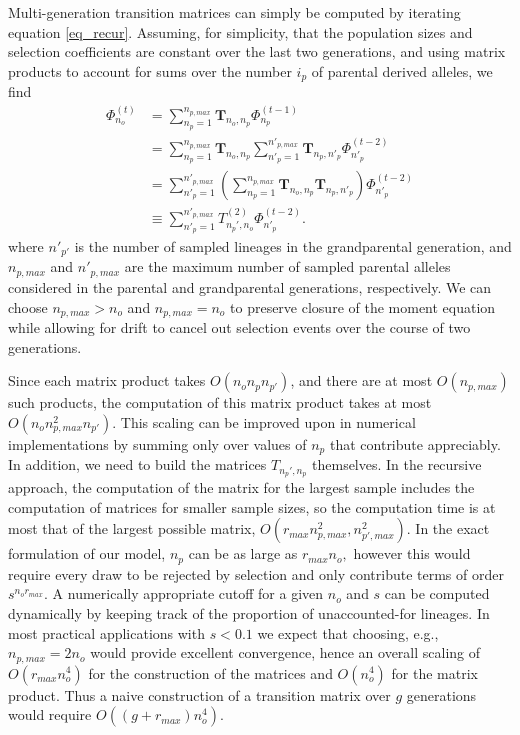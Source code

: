 \documentclass[9pt,twocolumn,twoside,lineno]{gsajnl}
\newcommand{\afs}[2]{\Phi_{#1}^{(#2)}}
\begin{document}
Multi-generation transition matrices can simply be computed by iterating equation \eqref{eq_recur}.
Assuming, for simplicity, that the population sizes and selection coefficients are constant over the
last two generations, and using matrix products to account for sums over the number $i_p$ of
parental derived alleles, we find
\begin{equation}
\begin{split}
\afs{n_o}{t} &=  \sum_{n_p=1}^{n_{p,max}}  \mathbf{T}_{n_o,n_p}     \afs{n_p}{t-1}\\
&=  \sum_{n_p=1}^{n_{p,max}} \mathbf{T}_{n_o,n_p}     \sum_{n'_p=1}^{n'_{p,max}}  \mathbf{T}_{n_p,n'_p}\afs{n'_p}{t-2}\\
&=  \sum_{n'_p=1}^{n'_{p,max}}  \left(\sum_{n_p=1}^{n_{p,max}} \mathbf{T}_{n_o,n_p}
    \mathbf{T}_{n_p,n'_p} \right)\afs{n'_p}{t-2}\\
&\equiv  \sum_{n'_p=1}^{n'_{p,max}}  T^{(2)}_{n_p',n_o} \afs{n'_p}{t-2}.
\end{split}
\end{equation}
where $n'_{p'}$ is the number of sampled lineages in the grandparental generation, and $n_{p,max}$
and $n'_{p,max}$ are the maximum number of sampled parental alleles considered in the parental and
grandparental generations, respectively.  We can choose $n_{p,max}>n_o$ and $n_{p,max} = n_o$  to
preserve closure of the moment equation while allowing for drift to cancel out selection events over
the course of two generations.

Since each matrix product takes $O(n_o n_p n_{p'})$, and there are at most $O(n_{p,max})$ such
products, the computation of this matrix product takes at most $O(n_o n_{p,max}^2 n_{p'}).$ This
scaling can be improved upon in numerical implementations by summing only over values of $n_p$ that
contribute appreciably.  In addition, we need to build the matrices $T_{n_p', n_p}$ themselves.  In
the recursive approach, the computation of the matrix for the largest sample includes the
computation of matrices for smaller sample sizes, so the computation time is at most that of the
largest possible matrix, $O(r_{max} n_{p,max}^2, n_{p',max}^2).$ In the exact formulation of our
model, $n_p$ can be as large as $ r_{max} n_o,$ however this would require every draw to be rejected
by selection and only contribute terms of order $s^{n_o r_{max}}.$ A numerically appropriate cutoff
for a given $n_o$ and $s$ can be computed dynamically by keeping track of the proportion of
unaccounted-for lineages. In most practical applications with $s<0.1$ we expect that choosing, e.g.,
$n_{p,max}=  2 n_o$ would provide excellent convergence, hence an overall scaling of   $O(r_{max}
n_{o}^4)$ for the construction of the matrices and $O(n_o^4)$ for the matrix product.  Thus a naive
construction of a transition matrix over $g$ generations would require  $O( (g + r_{max} ) n_o^4).$
\end{document}
